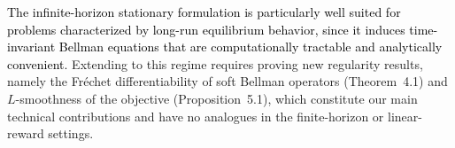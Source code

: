 \documentclass[11pt]{article}
\newcommand{\tb}[1]{\textcolor{black}{#1}} %
\begin{document}




\tb{The infinite-horizon stationary formulation is particularly well suited for problems characterized by long-run equilibrium behavior, since it induces time-invariant Bellman equations that are computationally tractable and analytically convenient.}
Extending to this regime requires proving new regularity results, namely the  Fr\'{e}chet differentiability of soft Bellman operators (Theorem~4.1) and $L$-smoothness of the objective (Proposition~5.1), which constitute our main technical contributions and have no analogues in the finite-horizon or linear-reward settings. 
\end{document}
